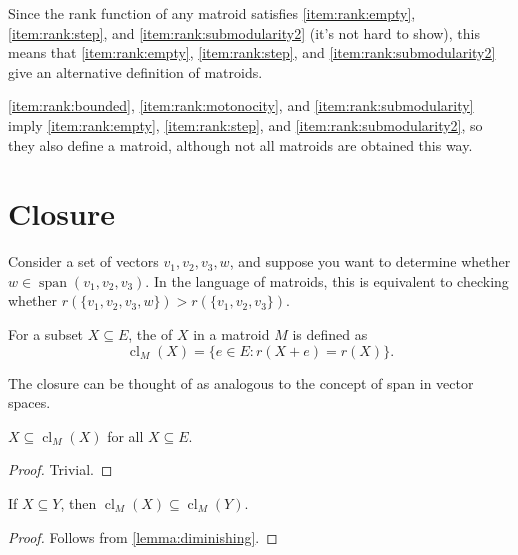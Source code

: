 Since the rank function of any matroid satisfies \ref{item:rank:empty}, \ref{item:rank:step}, and \ref{item:rank:submodularity2} (it's not hard to show), this means that \ref{item:rank:empty}, \ref{item:rank:step}, and \ref{item:rank:submodularity2} give an alternative definition of matroids.

\begin{note}
    \ref{item:rank:bounded}, \ref{item:rank:motonocity}, and \ref{item:rank:submodularity} imply \ref{item:rank:empty}, \ref{item:rank:step}, and \ref{item:rank:submodularity2}, so they also define a matroid, although not all matroids are obtained this way.
\end{note}

\section{Closure}

Consider a set of vectors \(v_1, v_2, v_3, w\), and suppose you want to determine whether \(w \in \operatorname{span}(v_1, v_2, v_3)\).
In the language of matroids, this is equivalent to checking whether \(r(\{v_1, v_2, v_3, w\}) > r(\{v_1, v_2, v_3\})\).

\begin{definition}[Closure]
    For a subset \(X \subseteq E\), the  of \(X\) in a matroid \(M\) is defined as
    \begin{equation}
        \operatorname{cl}_M(X) = \{e \in E : r(X + e) = r(X)\}.
    \end{equation}
\end{definition}

The closure can be thought of as analogous to the concept of span in vector spaces.

\begin{proposition} \label{prop:closure:inside}
    \(X \subseteq \operatorname{cl}_M(X)\) for all \(X \subseteq E\).
\end{proposition}

\begin{proof}
    Trivial.
\end{proof}

\begin{proposition} \label{prop:closure:monotonicity}
    If \(X \subseteq Y\), then \(\operatorname{cl}_M(X) \subseteq \operatorname{cl}_M(Y)\).
\end{proposition}

\begin{proof}
    Follows from \ref{lemma:diminishing}.
\end{proof}

